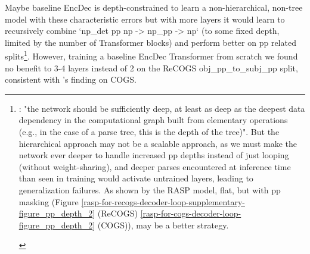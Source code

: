 \documentclass[11pt]{article}
\begin{document}
Maybe \citep{Wu2023} baseline EncDec is depth-constrained to learn a non-hierarchical, non-tree model with these characteristic errors but with more layers it would learn to recursively combine `np\_det pp np -> np\_pp -> np` (to some fixed depth, limited by the number of Transformer blocks) and perform better on pp related splits\footnote{\begin{footnotesize}\citep{Csordas2022}: "the network should be sufficiently deep, at least as deep as the deepest data dependency in the computational graph built from elementary operations (e.g., in the case of a parse tree, this is the depth of the tree)". But the hierarchical approach may not be a scalable approach, as we must make the network ever deeper to handle increased pp depths instead of just looping (without weight-sharing), and deeper parses encountered at inference time than seen in training would activate untrained layers, leading to generalization failures. As shown by the RASP model, flat, but with pp masking (Figure \ref{rasp-for-recogs-decoder-loop-supplementary-figure_pp_depth_2} (ReCOGS) \ref{rasp-for-cogs-decoder-loop-figure_pp_depth_2} (COGS)), may be a better strategy.\end{footnotesize}}. However, training a \citep{Wu2023} baseline EncDec Transformer from scratch we found no benefit to 3-4 layers instead of 2 on the ReCOGS obj\_pp\_to\_subj\_pp split, consistent with \citep{petty2024impactdepthcompositionalgeneralization}'s finding on COGS.
\end{document}
